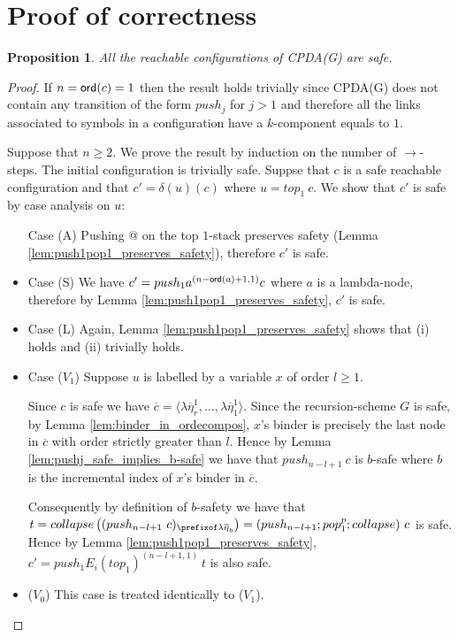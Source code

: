 \documentclass{article}
\newtheorem{proposition}{Proposition}[section]
\theoremstyle{remark}
\theoremstyle{definition}
\newcommand\orddec\overline
\begin{document}
\section{Proof of correctness}

\begin{proposition}
All the reachable configurations of CPDA(G) are safe.
\end{proposition}
\begin{proof}
If $n ={\sf ord}(c) =1$ then the result holds trivially since CPDA(G) does not contain
any transition of the form $push_j$ for $j>1$ and therefore all the links associated to symbols in a configuration have a $k$-component equals to $1$.

Suppose that $n\geq 2$. We prove the result by induction on the number of
$\rightarrow$-steps. The initial configuration is trivially safe.
Suppse that $c$ is a safe reachable configuration and that
$c'=\delta(u)(c)$ where $u = top_1\ c$.
We show that $c'$ is safe by case analysis on $u$:
\begin{itemize}
\item[Case (A)] Pushing @ on the top $1$-stack preserves safety (Lemma
\ref{lem:push1pop1_preserves_safety}), therefore $c'$ is safe.

\item Case (S)
We have $c' = push_1 a^{(n-{\sf ord}(a)+1,1)} c$ where $a$ is a
lambda-node, therefore by Lemma \ref{lem:push1pop1_preserves_safety},
$c'$ is safe.

\item Case (L) Again, Lemma \ref{lem:push1pop1_preserves_safety}
shows that (i) holds and (ii) trivially holds.

\item Case ($V_1$) Suppose $u$ is labelled by a variable $x$ of order $l\geq 1$.

Since $c$ is safe we have $\orddec{c} = \langle \lambda
\overline{\eta}_r^1 , \ldots, \lambda \overline{\eta}_1^1
\rangle$.
Since the recursion-scheme $G$ is safe, by Lemma \ref{lem:binder_in_ordecompos}, $x$'s binder is precisely the
last node in $\orddec{c}$ with order strictly greater than $l$.
Hence by Lemma \ref{lem:pushj_safe_implies_b-safe}
we have that $push_{n-l+1}\ c$ is $b$-safe where $b$ is the
incremental index of $x$'s binder in $\orddec{c}$.

Consequently by definition of $b$-safety we have that
$t = collapse \left( (push_{n-l+1}~ c)_{\prefixof \lambda
\overline{\eta}_{b}} \right) = (push_{n-l+1};pop_1^p;collapse)
~c$ is safe. Hence by
Lemma \ref{lem:push1pop1_preserves_safety}, $c' = push_1 E_i(top_1)^{(n-l+1,1)}\ t$ is also safe.

\item ($V_0$) This case is treated identically to ($V_1$).
\end{itemize}
\end{proof}
\end{document}
